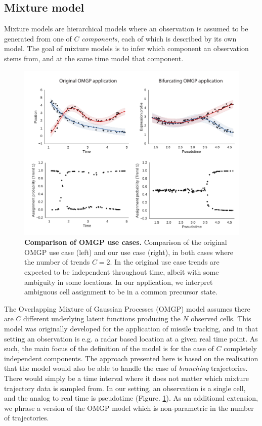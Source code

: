 \subsection{Mixture model}

Mixture models are hierarchical models where an observation is assumed to be generated from one of $ C $ \textit{components}, each of which is described by its own model. The goal of mixture models is to infer which component an observation stems from, and at the same time model that component.

\begin{figure}
    \centering
    \includegraphics[width=\textwidth]{"fig-omgp-apps"}
    \caption[Comparison of OMGP use cases]{\textbf{Comparison of OMGP use cases.} Comparison of the original OMGP use case (left) and our use case (right), in both cases where the number of trends \( C = 2 \). In the original use case trends are expected to be independent throughout time, albeit with some ambiguity in some locations. In our application, we interpret ambiguous cell assignment to be in a common precursor state.}
    \label{fig:omgpapps}
\end{figure}

The Overlapping Mixture of Gaussian Processes (OMGP) model \cite{Lazaro-Gredilla2012-ta} assumes there are $ C $ different underlying latent functions producing the $ N $ observed cells. This model was originally developed for the application of missile tracking, and in that setting an observation is e.g. a radar based location at a given real time point. As such, the main focus of the definition of the model is for the case of $ C $ completely independent components. The approach presented here is based on the realisation that the model would also be able to handle the case of \textit{branching} trajectories. There would simply be a time interval where it does not matter which mixture trajectory data is sampled from. In our setting, an observation is a single cell, and the analog to real time is pseudotime (Figure. \ref{fig:omgpapps}). As an additional extension, we phrase a version of the OMGP model which is non-parametric in the number of trajectories.

